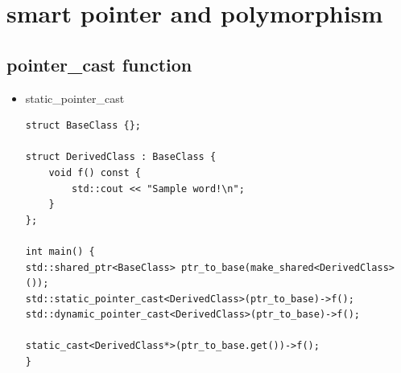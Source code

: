 \documentclass[a4paper,11pt,twoside]{book}
\begin{document}
\section{smart pointer and polymorphism}

\subsection{pointer\_cast function}
\begin{itemize}
	\item static\_pointer\_cast
\begin{lstlisting}
struct BaseClass {};

struct DerivedClass : BaseClass {
	void f() const {
		std::cout << "Sample word!\n";
	}
};

int main() {
std::shared_ptr<BaseClass> ptr_to_base(make_shared<DerivedClass>());
std::static_pointer_cast<DerivedClass>(ptr_to_base)->f();
std::dynamic_pointer_cast<DerivedClass>(ptr_to_base)->f();

static_cast<DerivedClass*>(ptr_to_base.get())->f();
}
\end{lstlisting}
\end{itemize}
\end{document}
